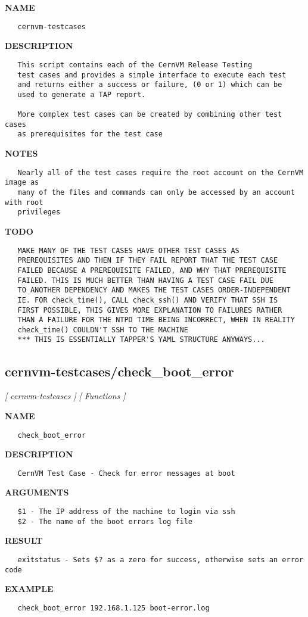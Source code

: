 \label{ch:robo33}
\label{ch:test_suite_cernvm_testcases}
\textbf{NAME}
\begin{verbatim}
   cernvm-testcases
\end{verbatim}
\textbf{DESCRIPTION}
\begin{verbatim}
   This script contains each of the CernVM Release Testing
   test cases and provides a simple interface to execute each test
   and returns either a success or failure, (0 or 1) which can be 
   used to generate a TAP report.

   More complex test cases can be created by combining other test cases
   as prerequisites for the test case
\end{verbatim}
\textbf{NOTES}
\begin{verbatim}
   Nearly all of the test cases require the root account on the CernVM image as 
   many of the files and commands can only be accessed by an account with root 
   privileges
\end{verbatim}
\textbf{TODO}
\begin{verbatim}
   MAKE MANY OF THE TEST CASES HAVE OTHER TEST CASES AS
   PREREQUISITES AND THEN IF THEY FAIL REPORT THAT THE TEST CASE
   FAILED BECAUSE A PREREQUISITE FAILED, AND WHY THAT PREREQUISITE
   FAILED. THIS IS MUCH BETTER THAN HAVING A TEST CASE FAIL DUE
   TO ANOTHER DEPENDENCY AND MAKES THE TEST CASES ORDER-INDEPENDENT
   IE. FOR check_time(), CALL check_ssh() AND VERIFY THAT SSH IS
   FIRST POSSIBLE, THIS GIVES MORE EXPLANATION TO FAILURES RATHER
   THAN A FAILURE FOR THE NTPD TIME BEING INCORRECT, WHEN IN REALITY
   check_time() COULDN'T SSH TO THE MACHINE
   *** THIS IS ESSENTIALLY TAPPER'S YAML STRUCTURE ANYWAYS...
\end{verbatim}
\newpage
\subsection{cernvm-testcases/check\_boot\_error}
\textsl{[ cernvm-testcases ]}
\textsl{[ Functions ]}

\label{ch:robo16}
\label{ch:cernvm_testcases_check_boot_error}
\textbf{NAME}
\begin{verbatim}
   check_boot_error
\end{verbatim}
\textbf{DESCRIPTION}
\begin{verbatim}
   CernVM Test Case - Check for error messages at boot
\end{verbatim}
\textbf{ARGUMENTS}
\begin{verbatim}
   $1 - The IP address of the machine to login via ssh
   $2 - The name of the boot errors log file
\end{verbatim}
\textbf{RESULT}
\begin{verbatim}
   exitstatus - Sets $? as a zero for success, otherwise sets an error code
\end{verbatim}
\textbf{EXAMPLE}
\begin{verbatim}
   check_boot_error 192.168.1.125 boot-error.log
\end{verbatim}
\newpage
